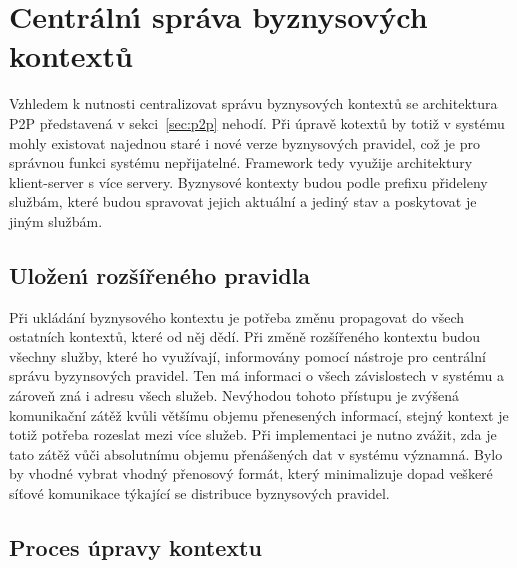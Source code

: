 \section{Centráln\'{\i} správa byznysových kontextů}

Vzhledem k nutnosti centralizovat správu byznysových kontextů se
architektura \gls{P2P} představená v sekci~\ref{sec:p2p} nehodí.
Při úpravě kotextů by totiž v systému mohly existovat najednou staré i nové verze
byznysových pravidel, což je pro správnou funkci systému nepřijatelné.
Framework tedy využije architektury klient-server s více servery.
Byznysové kontexty budou podle prefixu přideleny službám, které budou
spravovat jejich aktuální a jediný stav a poskytovat je jiným službám.

\subsection{Uložen\'{\i} rozšířeného pravidla}\label{sec:saving-context}

Při ukládání byznysového kontextu je potřeba změnu propagovat do všech ostatních kontextů, které od něj dědí.
Při změně rozšířeného kontextu budou všechny služby, které ho využívají, informovány pomocí nástroje pro
centrální správu byzynsových pravidel. Ten má informaci o všech závislostech v systému a zároveň zná i adresu všech
služeb. Nevýhodou tohoto přístupu je zvýšená komunikační zátěž kvůli většímu objemu přenesených informací, stejný kontext
je totiž potřeba rozeslat mezi více služeb. Při implementaci je nutno zvážit, zda je tato zátěž vůči absolutnímu objemu
přenášených dat v systému významná. Bylo by vhodné vybrat vhodný přenosový formát, který minimalizuje dopad veškeré síťové
komunikace týkající se distribuce byznysových pravidel.

\subsection{Proces úpravy kontextu}


